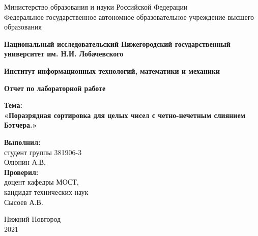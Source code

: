 \documentclass[12pt]{report}
\begin{document}
\begin{titlepage}
\begin{center}
    Министерство образования и науки Российской Федерации \\
    Федеральное государственное автономное образовательное учреждение высшего образования
\end{center}
\begin{center}
    \textbf{Национальный исследовательский Нижегородский государственный университет им. Н.И. Лобачевского} \\
\end{center}
\begin{center}
    \textbf{Институт информационных технологий, математики и механики}\\
\end{center}

\vspace{4em}

\begin{center}
    \textbf{\Large Отчет по лабораторной работе} \\
\end{center}

\begin{center}
    \textbf{Тема:} \\
    \textbf{\Large «Поразрядная сортировка для целых чисел с четно-нечетным слиянием Бэтчера.»}
\end{center}

\vspace{4em}

\begin{flushright}
\begin{minipage}{0.55\textwidth}
\begin{flushleft}

\textbf{Выполнил:} \\
студент группы 381906-3 \\
Олюнин А.В. \\

\textbf{Проверил:} \\
доцент кафедры МОСТ, \\
кандидат технических наук \\
Сысоев А.В. \\
\end{flushleft}
\end{minipage}
\end{flushright}


\vspace{\fill}

\begin{center}
Нижний Новгород \\
2021
\end{center}

\end{titlepage}
\end{document}
